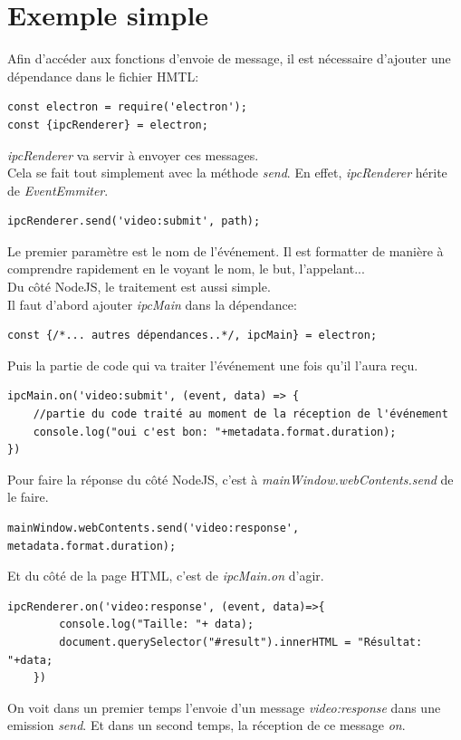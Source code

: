 \documentclass[12pt,oneside]{scrbook}
\begin{document}
\section{Exemple simple}
Afin d'accéder aux fonctions d'envoie de message, il est nécessaire d'ajouter une dépendance dans le fichier HMTL:
\begin{verbatim}
const electron = require('electron');
const {ipcRenderer} = electron;
\end{verbatim}
\textit{ipcRenderer} va servir à envoyer ces messages.\\
Cela se fait tout simplement avec la méthode \textit{send}. En effet, \textit{ipcRenderer} hérite de \textit{EventEmmiter}.
\begin{verbatim}
ipcRenderer.send('video:submit', path);
\end{verbatim}
Le premier paramètre est le nom de l'événement. Il est formatter de manière à comprendre rapidement en le voyant le nom, le but, l'appelant...\\
Du côté NodeJS, le traitement est aussi simple.\\
Il faut d'abord ajouter \textit{ipcMain} dans la dépendance:
\begin{verbatim}
const {/*... autres dépendances..*/, ipcMain} = electron;
\end{verbatim}

Puis la partie de code qui va traiter l'événement une fois qu'il l'aura reçu.
\begin{verbatim}
ipcMain.on('video:submit', (event, data) => {
    //partie du code traité au moment de la réception de l'événement
    console.log("oui c'est bon: "+metadata.format.duration);
})
\end{verbatim}
Pour faire la réponse du côté NodeJS, c'est à \textit{mainWindow.webContents.send} de le faire.
\begin{verbatim}
mainWindow.webContents.send('video:response', metadata.format.duration);
\end{verbatim}
Et du côté de la page HTML, c'est de \textit{ipcMain.on} d'agir.
\begin{verbatim}
ipcRenderer.on('video:response', (event, data)=>{
        console.log("Taille: "+ data);
        document.querySelector("#result").innerHTML = "Résultat: "+data;
    })
\end{verbatim}
On voit dans un premier temps l'envoie d'un message \textit{video:response} dans une emission \textit{send}. Et dans un second temps, la réception de ce message \textit{on}.
\end{document}
